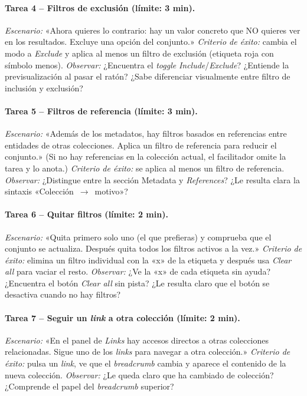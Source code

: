 \paragraph{Tarea 4 -- Filtros de exclusión (límite: 3 min).}
\textit{Escenario:} «Ahora quieres lo contrario: hay un valor concreto que NO quieres ver
en los resultados. Excluye una opción del conjunto.»
\textit{Criterio de éxito:} cambia el modo a \textit{Exclude} y aplica al menos un filtro de
exclusión (etiqueta roja con símbolo menos).
\textit{Observar:} ¿Encuentra el \textit{toggle} \textit{Include}/\textit{Exclude}? ¿Entiende la
previsualización al pasar el ratón? ¿Sabe diferenciar visualmente entre filtro de inclusión
y exclusión?

\paragraph{Tarea 5 -- Filtros de referencia (límite: 3 min).}
\textit{Escenario:} «Además de los metadatos, hay filtros basados en referencias entre
entidades de otras colecciones. Aplica un filtro de referencia para reducir el conjunto.»
(Si no hay referencias en la colección actual, el facilitador omite la tarea y lo anota.)
\textit{Criterio de éxito:} se aplica al menos un filtro de referencia.
\textit{Observar:} ¿Distingue entre la sección Metadata y \textit{References}? ¿Le resulta
clara la sintaxis «Colección~$\rightarrow$~motivo»?

\paragraph{Tarea 6 -- Quitar filtros (límite: 2 min).}
\textit{Escenario:} «Quita primero solo uno (el que prefieras) y comprueba que el conjunto
se actualiza. Después quita todos los filtros activos a la vez.»
\textit{Criterio de éxito:} elimina un filtro individual con la «x» de la etiqueta y
después usa \textit{Clear all} para vaciar el resto.
\textit{Observar:} ¿Ve la «x» de cada etiqueta sin ayuda? ¿Encuentra el botón
\textit{Clear all} sin pista? ¿Le resulta claro que el botón se desactiva cuando no hay
filtros?

\paragraph{Tarea 7 -- Seguir un \textit{link} a otra colección (límite: 2 min).}
\textit{Escenario:} «En el panel de \textit{Links} hay accesos directos a otras colecciones
relacionadas. Sigue uno de los \textit{links} para navegar a otra colección.»
\textit{Criterio de éxito:} pulsa un \textit{link}, ve que el \textit{breadcrumb} cambia y
aparece el contenido de la nueva colección.
\textit{Observar:} ¿Le queda claro que ha cambiado de colección? ¿Comprende el papel del
\textit{breadcrumb} superior?

